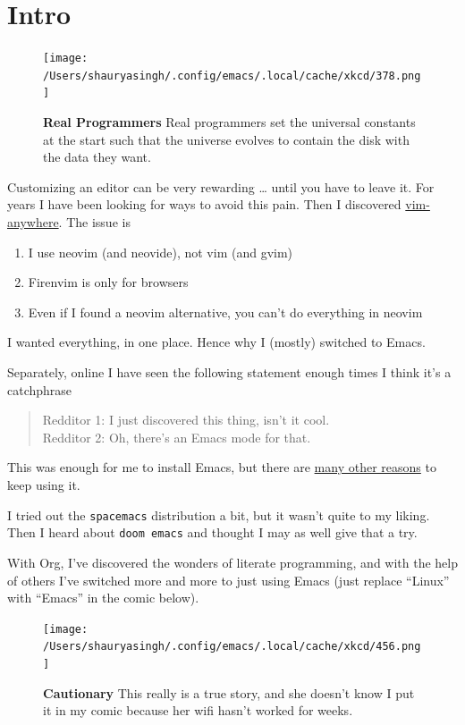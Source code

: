 \documentclass{scrartcl}
\begin{document}
\section{Intro}
\label{sec:org7a83017}
\begin{figure}[!htb]
    \centering
    \texttt{[image: /Users/shauryasingh/.config/emacs/.local/cache/xkcd/378.png]}
  \caption*{\label{xkcd:378} \textbf{Real Programmers} Real programmers set the universal constants at the start such that the universe evolves to contain the disk with the data they want.}
  \end{figure}

Customizing an editor can be very rewarding \ldots{} until you have to leave it.
For years I have been looking for ways to avoid this pain.
Then I discovered \href{https://github.com/cknadler/vim-anywhere}{vim-anywhere}. The issue is

\begin{enumerate}
\item I use neovim (and neovide), not vim (and gvim)
\item Firenvim is only for browsers
\item Even if I found a neovim alternative, you can't do everything in neovim
\end{enumerate}

I wanted everything, in one place. Hence why I (mostly) switched to Emacs.

Separately, online I have seen the following statement enough times I think it's a catchphrase
\begin{quote}
Redditor 1: I just discovered this thing, isn't it cool. \\
Redditor 2: Oh, there's an Emacs mode for that.
\end{quote}

This was enough for me to install Emacs, but there are
\href{https://github.com/remacs/remacs\#why-emacs}{many other reasons} to keep using it.

I tried out the \texttt{spacemacs} distribution a bit, but it wasn't quite to my liking.
Then I heard about \texttt{doom emacs} and thought I may as well give that a try.

With Org, I've discovered the wonders of literate programming, and with the help
of others I've switched more and more to just using Emacs (just replace
``Linux'' with ``Emacs'' in the comic below).

\begin{figure}[!htb]
    \centering
    \texttt{[image: /Users/shauryasingh/.config/emacs/.local/cache/xkcd/456.png]}
  \caption*{\label{xkcd:456} \textbf{Cautionary} This really is a true story, and she doesn't know I put it in my comic because her wifi hasn't worked for weeks.}
  \end{figure}
\end{document}
